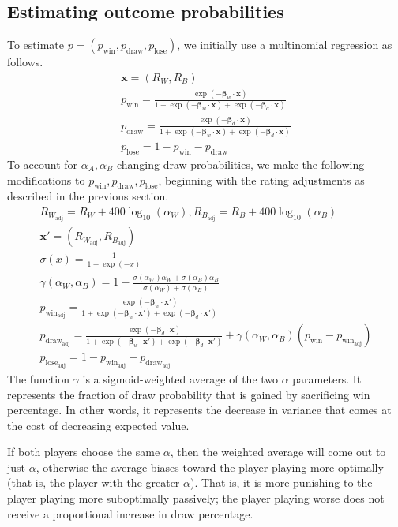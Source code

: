 \documentclass{article}
\newcommand{\pw}{p_{\text{win}}}
\newcommand{\pd}{p_{\text{draw}}}
\newcommand{\pl}{p_{\text{lose}}}
\newcommand{\Rw}{R_{W_{\text{adj}}}}
\newcommand{\Rb}{R_{B_{\text{adj}}}}
\begin{document}
\subsection{Estimating outcome probabilities}
To estimate $p=(\pw,\pd,\pl)$, we initially use a multinomial regression as follows.
\begin{gather*}
    \bm{x} = (R_W, R_B)\\
    \pw = \frac{\exp(-\bm{\beta}_w \cdot \bm{x})}
    {1+\exp(-\bm{\beta}_w \cdot \bm{x}) + \exp(-\bm{\beta}_d \cdot \bm{x})} \\
    \pd = \frac{\exp(-\bm{\beta}_d \cdot \bm{x})}
    {1+\exp(-\bm{\beta}_w \cdot \bm{x}) + \exp(-\bm{\beta}_d \cdot \bm{x})} \\
    \pl = 1 - \pw - \pd
\end{gather*}
To account for $\alpha_A, \alpha_B$ changing draw probabilities, we make the following
modifications to $\pw,\pd,\pl$,
beginning with the rating adjustments as described in the previous section.
\begin{gather*}
    R_{W_{\text{adj}}} = R_W + 400\log_{10}(\alpha_W), R_{B_{\text{adj}}} = R_B + 400\log_{10}(\alpha_B) \\
    \bm{x}'=(\Rw, \Rb)\\
    \sigma(x) = \frac{1}{1+\exp(-x)} \\
    \gamma(\alpha_W, \alpha_B) = 1 - \frac{\sigma(\alpha_W)\alpha_W + \sigma(\alpha_B)\alpha_B}
    {\sigma(\alpha_W)+\sigma(\alpha_B)} \\
    p_{\text{win}_{\text{adj}}} = \frac{\exp(-\bm{\beta}_w \cdot \bm{x}')}
    {1+\exp(-\bm{\beta}_w \cdot \bm{x}') + \exp(-\bm{\beta}_d \cdot \bm{x}')} \\
    p_{\text{draw}_{\text{adj}}} = \frac{\exp(-\bm{\beta}_d \cdot \bm{x})}
    {1+\exp(-\bm{\beta}_w \cdot \bm{x}') + \exp(-\bm{\beta}_d \cdot \bm{x}')}
    + \gamma(\alpha_W,\alpha_B)\left( \pw - p_{\text{win}_{\text{adj}}} \right)\\
    p_{\text{lose}_{\text{adj}}} = 1- p_{\text{win}_{\text{adj}}} - p_{\text{draw}_{\text{adj}}}
\end{gather*}
The function $\gamma$ is a sigmoid-weighted average of the two $\alpha$ parameters.
It represents the fraction of draw probability that is gained by sacrificing win percentage.
In other words, it represents the decrease in variance that comes at the cost of decreasing
expected value.

If both players choose the same $\alpha$, then the weighted average
will come out to just $\alpha$, otherwise the average biases toward
the player playing more optimally (that is, the player with the greater $\alpha$).
That is, it is more punishing to the player playing more suboptimally passively; the
player playing worse does not receive a proportional increase in draw percentage.
\end{document}
